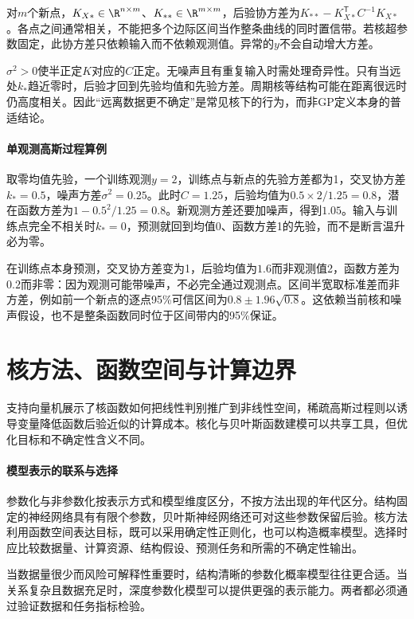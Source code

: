 对$m$个新点，$K_{X*}\in\R^{n\times m}$、$K_{**}\in\R^{m\times m}$，后验协方差为$K_{**}-K_{X*}^{\mathsf T}C^{-1}K_{X*}$。各点之间通常相关，不能把多个边际区间当作整条曲线的同时置信带。若核超参数固定，此协方差只依赖输入而不依赖观测值。异常的$y$不会自动增大方差。

$\sigma^2>0$使半正定$K$对应的$C$正定。无噪声且有重复输入时需处理奇异性。只有当远处$k_*$趋近零时，后验才回到先验均值和先验方差。周期核等结构可能在距离很远时仍高度相关。因此“远离数据更不确定”是常见核下的行为，而非GP定义本身的普适结论。

\paragraph{单观测高斯过程算例}
取零均值先验，一个训练观测$y=2$，训练点与新点的先验方差都为1，交叉协方差$k_*=0.5$，噪声方差$\sigma^2=0.25$。此时$C=1.25$，后验均值为$0.5\times2/1.25=0.8$，潜在函数方差为$1-0.5^2/1.25=0.8$。新观测方差还要加噪声，得到$1.05$。输入与训练点完全不相关时$k_*=0$，预测就回到均值0、函数方差1的先验，而不是断言温升必为零。

在训练点本身预测，交叉协方差变为1，后验均值为$1.6$而非观测值2，函数方差为$0.2$而非零：因为观测可能带噪声，不必完全通过观测点。区间半宽取标准差而非方差，例如前一个新点的逐点95\%可信区间为$0.8\pm1.96\sqrt{0.8}$。这依赖当前核和噪声假设，也不是整条函数同时位于区间带内的95\%保证。

\section{核方法、函数空间与计算边界}
支持向量机展示了核函数如何把线性判别推广到非线性空间，稀疏高斯过程则以诱导变量降低函数后验近似的计算成本\cite{cortes1995svm,titsias2009sparsegp}。核化与贝叶斯函数建模可以共享工具，但优化目标和不确定性含义不同。
\paragraph{模型表示的联系与选择}
参数化与非参数化按表示方式和模型维度区分，不按方法出现的年代区分。结构固定的神经网络具有有限个参数，贝叶斯神经网络还可对这些参数保留后验。核方法利用函数空间表达目标，既可以采用确定性正则化，也可以构造概率模型。选择时应比较数据量、计算资源、结构假设、预测任务和所需的不确定性输出。

\begin{remark}
 当数据量很少而风险可解释性重要时，结构清晰的参数化概率模型往往更合适。当关系复杂且数据充足时，深度参数化模型可以提供更强的表示能力。两者都必须通过验证数据和任务指标检验。
\end{remark}

